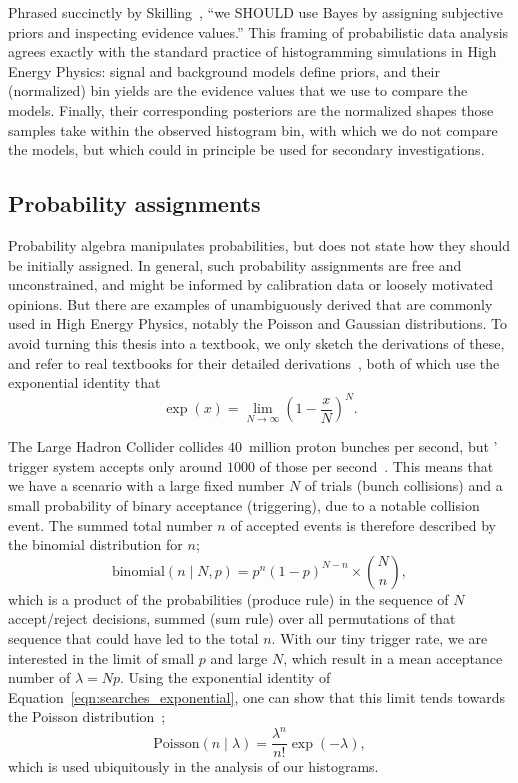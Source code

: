 Phrased succinctly by Skilling~\cite{skilling2008rant},
``we SHOULD use Bayes by assigning subjective priors and inspecting evidence
values.''
This framing of probabilistic data analysis agrees exactly with the standard
practice of histogramming simulations in High Energy Physics:
signal and background models define priors, and their (normalized) bin yields
are the evidence values that we use to compare the models.
Finally, their corresponding posteriors are the normalized shapes those samples
take within the observed histogram bin, with which we do not compare the
models, but which could in principle be used for secondary investigations.


\subsection{Probability assignments}
Probability algebra manipulates probabilities, but does not state how they
should be initially assigned.
In general, such probability assignments are free and unconstrained, and might
be informed by calibration data or loosely motivated opinions.
But there are examples of unambiguously derived that are commonly used in
High Energy Physics, notably the Poisson and Gaussian distributions.
To avoid turning this thesis into a textbook, we only sketch the derivations
of these, and refer to real textbooks for their detailed
derivations~\cite{jaynes2003probability}, both of which use the exponential
identity that
\begin{equation}
\label{eqn:searches_exponential}
\exp(x) = \displaystyle \lim_{N \to \infty}
\left(1 - \frac{x}{N}\right)^N
.
\end{equation}

The Large Hadron Collider collides $40$~million proton bunches per second,
but \atlas' trigger system accepts only around $1000$ of
those per second~\cite{atlas2020trigger}.
This means that we have a scenario with a large fixed number $N$ of trials
(bunch collisions)
and a small probability of binary acceptance (triggering),
due to a notable collision event.
The summed total number $n$ of accepted events is therefore described by the
binomial distribution for $n$;
\begin{equation}
\label{eqn:searches_binomial}
\mathrm{binomial}(n\mid N, p) = p^n (1 - p)^{N - n} \times \binom{N}{n}
,
\end{equation}
which is a product of the probabilities (produce rule) in the sequence of $N$
accept/reject decisions, summed (sum rule) over all permutations of that sequence
that could have led to the total $n$.
With our tiny trigger rate, we are interested in the limit of small
$p$ and large $N$, which result in a mean acceptance number of $\lambda = Np$.
Using the exponential identity of Equation~\ref{eqn:searches_exponential}, one
can show that this limit tends towards the Poisson
distribution~\cite{jaynes2003probability};
\begin{equation}
\label{eqn:searches_poisson}
\mathrm{Poisson}(n\mid \lambda) = \frac{\lambda^n}{n!}\exp(-\lambda)
,
\end{equation}
which is used ubiquitously in the analysis of our histograms.

